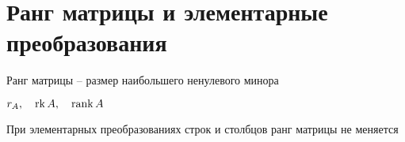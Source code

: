 \section{Ранг матрицы и элементарные преобразования}

\begin{definition}
	Ранг матрицы -- размер наибольшего ненулевого минора
\end{definition}

\begin{notation}
	$ r_A, \quad \operatorname{rk} A, \quad \operatorname{rank} A $
\end{notation}

\begin{theorem}
	При элементарных преобразованиях строк и столбцов ранг матрицы не меняется
\end{theorem}

